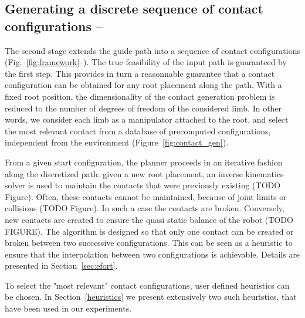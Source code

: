 \subsection{Generating a discrete sequence of contact configurations -- \Pb}

The second stage extends the guide path into a sequence of contact configurations (Fig.~\ref{fig:framework}--\Pb). The true feasibility of the input path is guaranteed by the first step.
This provides in turn a reasonnable guarantee that a contact configuration can be obtained for any root placement along the path. With a fixed root position, the dimensionality of the 
contact generation problem is reduced to the number of degrees of freedom of the considered limb. In other words, we consider each limb as a manipulator attached to the root, and select the most relevant contact from a database of precomputed configurations, independent from the environment (Figure~\ref{fig:contact_gen}).

From a given start configuration, the planner proceeds in an iterative fashion along the discretized path: given a new root placement, an inverse kinematics solver 
is used to maintain the contacts that were previously existing (TODO Figure). Often, these contacts cannot be maintained, because of joint limits or collisions (TODO Figure).
In such a case the contacts are broken. Conversely, new contacts are created to ensure the quasi static balance of the robot (TODO FIGURE).
The algorithm is designed so that only one contact can be created or broken between two successive configurations. This can be seen as a heuristic to ensure
that the interpolation between two configurations is achievable.
Details are presented in Section~\ref{sec:efort}. 

To select the "most relevant" contact configurations, user defined heuristics can be chosen. In Section~\ref{heuristics} we present extensively two such heuristics, that have been
used in our experiments.



